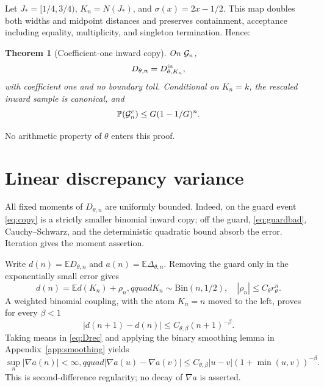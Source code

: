 \documentclass[11pt]{article}
\numberwithin{equation}{section}
\newtheorem{theorem}{Theorem}[section]
\theoremstyle{definition}\newtheorem{definition}[theorem]{Definition}
\theoremstyle{remark}\newtheorem{remark}[theorem]{Remark}
\newcommand{\E}{\mathbb E}\newcommand{\Pp}{\mathbb P}
\newcommand{\1}{\mathbf 1}\newcommand{\cD}{\mathcal D}
\begin{document}
Let $J_*=[1/4,3/4)$, $K_n=N(J_*)$, and $\sigma(x)=2x-1/2$.  This map doubles
both widths and midpoint distances and preserves containment, acceptance
including equality, multiplicity, and singleton termination.  Hence:
\begin{theorem}[Coefficient-one inward copy]\label{thm:guard}
On $\mathcal G_n$,
\begin{equation}D_{\theta,n}=D^{\rm in}_{\theta,K_n},           \label{eq:copy}
\end{equation}
with coefficient one and no boundary toll.  Conditional on $K_n=k$, the
rescaled inward sample is canonical, and
\begin{equation}\Pp(\cG_n^c)\le G(1-1/G)^n.                   \label{eq:guardbad}
\end{equation}
\end{theorem}
No arithmetic property of $\theta$ enters this proof.

\clearpage
\section{Linear discrepancy variance}\label{sec:Dvar}
All fixed moments of $D_{\theta,n}$ are uniformly bounded.  Indeed, on the
guard event \eqref{eq:copy} is a strictly smaller binomial inward copy; off
the guard, \eqref{eq:guardbad}, Cauchy--Schwarz, and the deterministic
quadratic bound absorb the error.  Iteration gives the moment assertion.

Write $d(n)=\E D_{\theta,n}$ and $a(n)=\E\Delta_{\theta,n}$.  Removing the
guard only in the exponentially small error gives
\begin{equation}d(n)=\E d(K_n)+\rho_n,qquad K_n\sim\mathrm{Bin}(n,1/2),
 \quad |\rho_n|\le C_\theta r_\theta^n.                        \label{eq:dmean}
\end{equation}
A weighted binomial coupling, with the atom $K_n=n$ moved to the left,
proves for every $\beta<1$
\begin{equation}|d(n+1)-d(n)|\le C_{\theta,\beta}(n+1)^{-\beta}.
                                                                  \label{eq:dregular}
\end{equation}
Taking means in \eqref{eq:Drec} and applying the binary smoothing lemma in
Appendix~\ref{app:smoothing} yields
\begin{equation}
 \sup_n|\nabla a(n)|<\infty,qquad
 |\nabla a(u)-\nabla a(v)|\le C_{\theta,\beta}|u-v|
 (1+\min(u,v))^{-\beta}.                                      \label{eq:aregular}
\end{equation}
This is second-difference regularity; no decay of $\nabla a$ is asserted.
\end{document}
